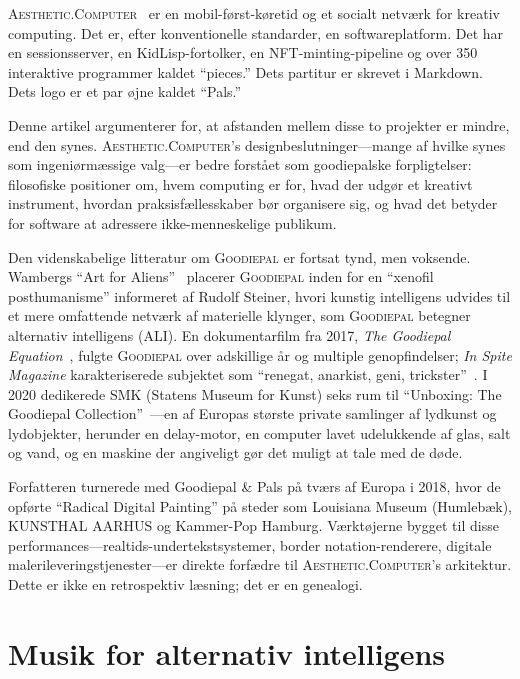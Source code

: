 \documentclass[10pt,letterpaper,twocolumn]{article}
\newcommand{\ac}{\textsc{Aesthetic.Computer}}
\newcommand{\gp}{\textsc{Goodiepal}}
\begin{document}
\ac{}~\citep{scudder2026ac} er en mobil-først-køretid og et socialt netværk for kreativ computing. Det er, efter konventionelle standarder, en softwareplatform. Det har en sessionsserver, en KidLisp-fortolker, en NFT-minting-pipeline og over 350 interaktive programmer kaldet ``pieces.'' Dets partitur er skrevet i Markdown. Dets logo er et par øjne kaldet ``Pals.''

Denne artikel argumenterer for, at afstanden mellem disse to projekter er mindre, end den synes. \ac{}'s designbeslutninger---mange af hvilke synes som ingeniørmæssige valg---er bedre forstået som goodiepalske forpligtelser: filosofiske positioner om, hvem computing er for, hvad der udgør et kreativt instrument, hvordan praksisfællesskaber bør organisere sig, og hvad det betyder for software at adressere ikke-menneskelige publikum.

Den videnskabelige litteratur om \gp{} er fortsat tynd, men voksende. Wambergs ``Art for Aliens''~\citep{wamberg2022artforaliens} placerer \gp{} inden for en ``xenofil posthumanisme'' informeret af Rudolf Steiner, hvori kunstig intelligens udvides til et mere omfattende netværk af materielle klynger, som \gp{} betegner alternativ intelligens (ALI). En dokumentarfilm fra 2017, \emph{The Goodiepal Equation}~\citep{sanpakkila2017equation}, fulgte \gp{} over adskillige år og multiple genopfindelser; \emph{In Spite Magazine} karakteriserede subjektet som ``renegat, anarkist, geni, trickster''~\citep{inspite2024goodiepal}. I 2020 dedikerede SMK (Statens Museum for Kunst) seks rum til ``Unboxing: The Goodiepal Collection''~\citep{smk2020unboxing}---en af Europas største private samlinger af lydkunst og lydobjekter, herunder en delay-motor, en computer lavet udelukkende af glas, salt og vand, og en maskine der angiveligt gør det muligt at tale med de døde.

Forfatteren turnerede med Goodiepal \& Pals på tværs af Europa i 2018, hvor de opførte ``Radical Digital Painting'' på steder som Louisiana Museum (Humlebæk), KUNSTHAL AARHUS og Kammer-Pop Hamburg. Værktøjerne bygget til disse performances---realtids-undertekstsystemer, border notation-renderere, digitale malerileveringstjenester---er direkte forfædre til \ac{}'s arkitektur. Dette er ikke en retrospektiv læsning; det er en genealogi.

\section{Musik for alternativ intelligens}
\end{document}
